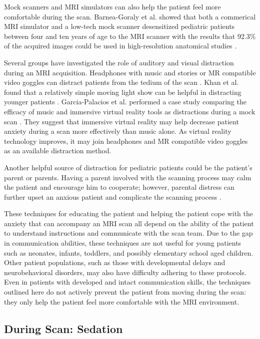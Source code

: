 Mock scanners and MRI simulators can also help the patient feel more comfortable during the scan. Barnea-Goraly et al. showed that both a commerical MRI simulator and a low-tech mock scanner desensitized pediatric patients between four and ten years of age to the MRI scanner with the results that 92.3\% of the acquired images could be used in high-resolution anatomical studies \cite{Barnea-Goraly2014}. 

Several groups have investigated the role of auditory and visual distraction during an MRI acquisition. Headphones with music and stories or MR compatible video goggles can distract patients from the tedium of the scan \cite{Alexander2012} \cite{Barnea-Goraly2014} \cite{Harned2001}. Khan et al. found that a relatively simple moving light show can be helpful in distracting younger patients \cite{Khan2007}. Garcia-Palacios et al. performed a case study comparing the efficacy of music and immersive virtual reality tools as distractions during a mock scan \cite{Garcia-Palacios2007}. They suggest that immersive virtual reality may help decrease patient anxiety during a scan more effectively than music alone. As virtual reality technology improves, it may join headphones and MR compatible video goggles as an available distraction method.

Another helpful source of distraction for pediatric patients could be the patient's parent or parents. Having a parent involved with the scanning process may calm the patient and encourage him to cooperate; however, parental distress can further upset an anxious patient and complicate the scanning process \cite{Alexander2012}. 

These techniques for educating the patient and helping the patient cope with the anxiety that can accompany an MRI scan all depend on the ability of the patient to understand instructions and communicate with the scan team. Due to the gap in communication abilities, these techniques are not useful for young patients such as neonates, infants, toddlers, and possibly elementary school aged children. Other patient populations, such as those with developmental delays and neurobehavioral disorders, may also have difficulty adhering to these protocols. Even in patients with developed and intact communication skills, the techniques outlined here do not actively prevent the patient from moving during the scan: they only help the patient feel more comfortable with the MRI environment.

\subsection{During Scan: Sedation}

